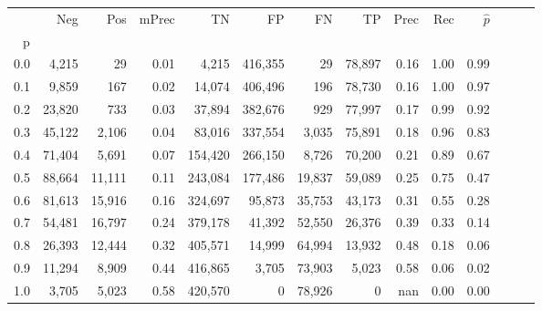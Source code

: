 \begin{tabular}{rrrrrrrrrrrrrr}
\toprule
{} &     Neg &     Pos & mPrec &       TN &       FP &      FN &      TP &  Prec &   Rec & $\hat{p}$ \\
p   &         &         &       &          &          &         &         &       &       &           \\
\midrule
0.0 &   4,215 &      29 &  0.01 &    4,215 &  416,355 &      29 &  78,897 &  0.16 &  1.00 &      0.99 \\
0.1 &   9,859 &     167 &  0.02 &   14,074 &  406,496 &     196 &  78,730 &  0.16 &  1.00 &      0.97 \\
0.2 &  23,820 &     733 &  0.03 &   37,894 &  382,676 &     929 &  77,997 &  0.17 &  0.99 &      0.92 \\
0.3 &  45,122 &   2,106 &  0.04 &   83,016 &  337,554 &   3,035 &  75,891 &  0.18 &  0.96 &      0.83 \\
0.4 &  71,404 &   5,691 &  0.07 &  154,420 &  266,150 &   8,726 &  70,200 &  0.21 &  0.89 &      0.67 \\
0.5 &  88,664 &  11,111 &  0.11 &  243,084 &  177,486 &  19,837 &  59,089 &  0.25 &  0.75 &      0.47 \\
0.6 &  81,613 &  15,916 &  0.16 &  324,697 &   95,873 &  35,753 &  43,173 &  0.31 &  0.55 &      0.28 \\
0.7 &  54,481 &  16,797 &  0.24 &  379,178 &   41,392 &  52,550 &  26,376 &  0.39 &  0.33 &      0.14 \\
0.8 &  26,393 &  12,444 &  0.32 &  405,571 &   14,999 &  64,994 &  13,932 &  0.48 &  0.18 &      0.06 \\
0.9 &  11,294 &   8,909 &  0.44 &  416,865 &    3,705 &  73,903 &   5,023 &  0.58 &  0.06 &      0.02 \\
1.0 &   3,705 &   5,023 &  0.58 &  420,570 &        0 &  78,926 &       0 &   nan &  0.00 &      0.00 \\
\bottomrule
\end{tabular}
